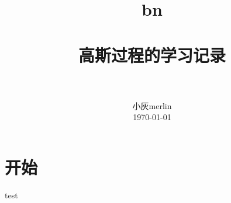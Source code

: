 \documentclass[a4paper, 12pt, CJKnumber, UTF8, openany,nofonts, fancyhdr]{ctexbook}
\title{
        \usefont{OT1}{bch} {b}{n}
        \normalfont \normalsize \textsc{} \\ [25pt]
        \horrule{1.5pt} \\[0.4cm]
        \huge 高斯过程的学习记录\\
        \horrule{1.5pt} \\[0.5cm]
}
\author {
        \normalfont                                 \normalsize
        小灰merlin\\[-2pt]      \normalsize
        \today
}
\date{}
\begin{document}
\linespread{1.69}\selectfont
\maketitle
\eject
\tableofcontents
\eject

\frontmatter %
\linespread{1.4}


\selectfont
\renewcommand*{\contentsname}{目\qquad 录}
\renewcommand*\listfigurename{\textbf{插\ 图\ 目\ 录}}
\renewcommand*\listtablename{\textbf{表\ 格\ 目\ 录}}
\renewcommand*\bibname{\textbf{参\ 考\ 文\ 献}}

\mainmatter %
\linespread{1.5}\selectfont
\setlength{\topskip}{0mm}
\newcommand{\upcite}[1]{\textsuperscript{\textsuperscript{\cite{#1}}}}

\section{开始}
test
\end{document}
